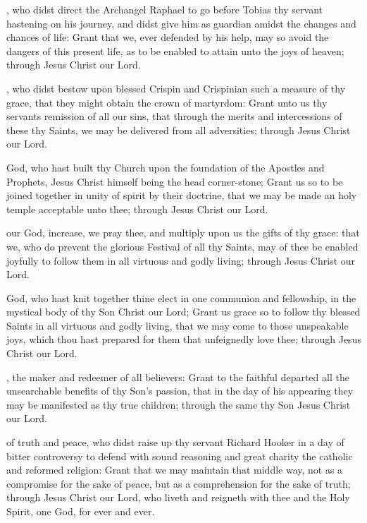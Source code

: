 , who didst direct the Archangel Raphael to go before Tobias thy servant hastening on his journey, and didst give him as guardian amidst the changes and chances of life: Grant that we, ever defended by his help, may so avoid the dangers of this present life, as to be enabled to attain unto the joys of heaven; through Jesus Christ our Lord.

, who didst bestow upon blessed Crispin and Crispinian such a measure of thy grace, that they might obtain the crown of martyrdom: Grant unto us thy servants remission of all our sins, that through the merits and intercessions of these thy Saints, we may be delivered from all adversities; through Jesus Christ our Lord.

 God, who hast built thy Church upon the foundation of the Apostles and Prophets, Jesus Christ himself being the head corner-stone; Grant us so to be joined together in unity of spirit by their doctrine, that we may be made an holy temple acceptable unto thee; through Jesus Christ our Lord.

 our God, increase, we pray thee, and multiply upon us the gifts of thy grace: that we, who do prevent the glorious Festival of all thy Saints, may of thee be enabled joyfully to follow them in all virtuous and godly living; through Jesus Christ our Lord.

 God, who hast knit together thine elect in one communion and fellowship, in the mystical body of thy Son Christ our Lord; Grant us grace so to follow thy blessed Saints in all virtuous and godly living, that we may come to those unspeakable joys, which thou hast prepared for them that unfeignedly love thee; through Jesus Christ our Lord.

, the maker and redeemer of all believers: Grant to the faithful departed all the unsearchable benefits of thy Son's passion, that in the day of his appearing they may be manifested as thy true children; through the same thy Son Jesus Christ our Lord.

 of truth and peace, who didst raise up thy servant Richard Hooker in a day of bitter controversy to defend with sound reasoning and great charity the catholic and reformed religion: Grant that we may maintain that middle way, not as a compromise for the sake of peace, but as a comprehension for the sake of truth; through Jesus Christ our Lord, who liveth and reigneth with thee and the Holy Spirit, one God, for ever and ever.

